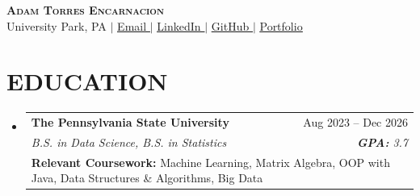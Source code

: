 \documentclass[letterpaper,11pt]{article}
\makeatletter
\newcommand{\resumeSubheadingWithDetail}[5]{
  \item
    \begin{tabular*}{0.97\textwidth}[t]{l@{\extracolsep{\fill}}r}
      \textbf{#1} & #2 \\
      \textit{\small#3} & \textit{\small #4} \\
      \multicolumn{2}{l}{\small #5} \\
    \end{tabular*}\vspace{-7pt}
}
\newcommand{\resumeSubHeadingListStart}{\begin{itemize}[leftmargin=0.15in, label={}]}
\newcommand{\resumeSubHeadingListEnd}{\end{itemize}}
\newcommand{\vercelLogo}{\raisebox{0.02em}{\scalebox{1.43}[1.148]{$\blacktriangle$}}}
\makeatother
\begin{document}
\begin{center}
    \textbf{\Huge \scshape Adam Torres Encarnacion} \\ \vspace{1pt}
    \small University Park, PA $|$ \href{mailto:art5809@psu.edu}{\underline{Email \faEnvelope}} $|$
    \href{https://www.linkedin.com/in/adam-torres-encarnacion/}{\underline{LinkedIn \faLinkedin}} $|$
    \href{https://github.com/0xABAN}{\underline{GitHub \faGithub}} $|$
    \href{https://advm.dev/}{\underline{Portfolio \vercelLogo}}
\end{center}


\section{\textbf{EDUCATION}}
  \resumeSubHeadingListStart
    \resumeSubheadingWithDetail
    {The Pennsylvania State University}{Aug 2023 -- Dec 2026}
      {B.S. in Data Science, B.S. in Statistics}{\textbf{\textit{GPA:}} 3.7}
      {\textbf{Relevant Coursework:} Machine Learning, Matrix Algebra, OOP with Java, Data Structures \& Algorithms, Big Data}
  \resumeSubHeadingListEnd

\end{document}
